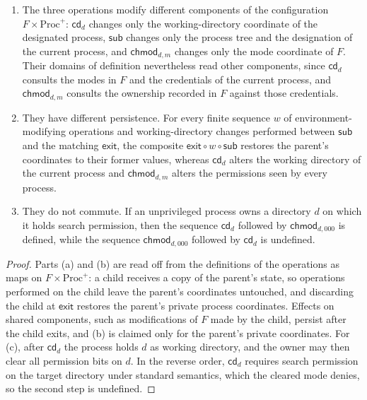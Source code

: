\begin{proposition}\label{prop:cdsubchmod}
\begin{enumerate}[label=(\alph*)]
\item The three operations modify different components of the configuration $F\times\mathrm{Proc}^{+}$: $\mathsf{cd}_d$ changes only the working-directory coordinate of the designated process, $\mathsf{sub}$ changes only the process tree and the designation of the current process, and $\mathsf{chmod}_{d,m}$ changes only the mode coordinate of $F$. Their domains of definition nevertheless read other components, since $\mathsf{cd}_d$ consults the modes in $F$ and the credentials of the current process, and $\mathsf{chmod}_{d,m}$ consults the ownership recorded in $F$ against those credentials.
\item They have different persistence. For every finite sequence $w$ of environment-modifying operations and working-directory changes performed between $\mathsf{sub}$ and the matching $\mathsf{exit}$, the composite $\mathsf{exit}\circ w\circ\mathsf{sub}$ restores the parent's coordinates to their former values, whereas $\mathsf{cd}_d$ alters the working directory of the current process and $\mathsf{chmod}_{d,m}$ alters the permissions seen by every process.
\item They do not commute. If an unprivileged process owns a directory $d$ on which it holds search permission, then the sequence $\mathsf{cd}_d$ followed by $\mathsf{chmod}_{d,000}$ is defined, while the sequence $\mathsf{chmod}_{d,000}$ followed by $\mathsf{cd}_d$ is undefined.
\end{enumerate}
\end{proposition}
\begin{proof}
Parts (a) and (b) are read off from the definitions of the operations as maps on $F\times\mathrm{Proc}^{+}$: a child receives a copy of the parent's state, so operations performed on the child leave the parent's coordinates untouched, and discarding the child at $\mathsf{exit}$ restores the parent's private process coordinates. Effects on shared components, such as modifications of $F$ made by the child, persist after the child exits, and (b) is claimed only for the parent's private coordinates. For (c), after $\mathsf{cd}_d$ the process holds $d$ as working directory, and the owner may then clear all permission bits on $d$. In the reverse order, $\mathsf{cd}_d$ requires search permission on the target directory under standard semantics, which the cleared mode denies, so the second step is undefined.
\end{proof}

